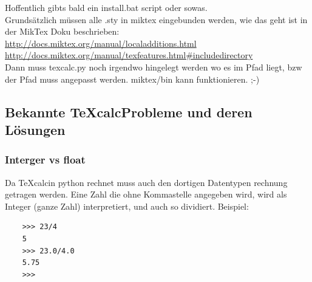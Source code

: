 \documentclass[a4paper]{article}
\newcommand{\texcalc}{{\TeX}calc}
\begin{document}
Hoffentlich gibts bald ein install.bat script oder sowas. \\

Grundsätzlich müssen alle .sty in miktex eingebunden werden, wie das
geht ist in der MikTex Doku beschrieben:\\

\url{http://docs.miktex.org/manual/localadditions.html}\\
\url{http://docs.miktex.org/manual/texfeatures.html#includedirectory}\\

%
%

Dann muss texcalc.py noch irgendwo hingelegt werden wo es im Pfad liegt, bzw
der Pfad muss angepasst werden. miktex/bin kann funktionieren. ;-)\\


\subsection{Bekannte \texcalc Probleme und deren Lösungen}

\subsubsection{Interger vs float}
\label{integer}

Da \texcalc in python rechnet muss auch den dortigen Datentypen rechnung getragen werden.
Eine Zahl die ohne Kommastelle angegeben wird, wird als Integer (ganze Zahl) interpretiert,
und auch so dividiert. Beispiel:\\

\begin{verbatim}
	>>> 23/4
	5
	>>> 23.0/4.0
	5.75
	>>>
\end{verbatim}
\end{document}
